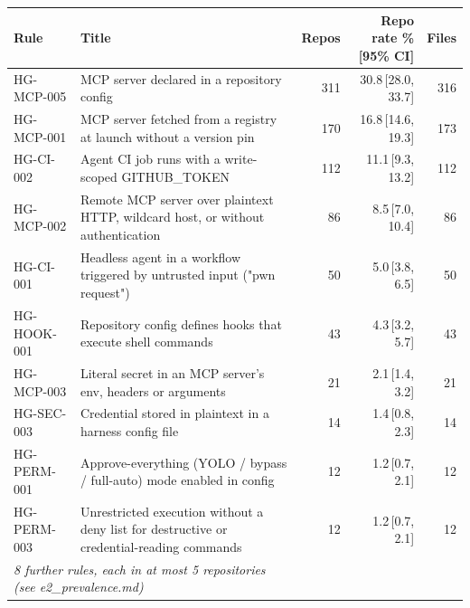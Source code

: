 \begin{tabular}{llrrr}
\toprule
Rule & Title & Repos & Repo rate \% [95\% CI] & Files \\
\midrule
HG-MCP-005 & MCP server declared in a repository config & 311 & 30.8\,[28.0, 33.7] & 316 \\
HG-MCP-001 & MCP server fetched from a registry at launch without a version pin & 170 & 16.8\,[14.6, 19.3] & 173 \\
HG-CI-002 & Agent CI job runs with a write-scoped GITHUB\_TOKEN & 112 & 11.1\,[9.3, 13.2] & 112 \\
HG-MCP-002 & Remote MCP server over plaintext HTTP, wildcard host, or without authentication & 86 & 8.5\,[7.0, 10.4] & 86 \\
HG-CI-001 & Headless agent in a workflow triggered by untrusted input ("pwn request") & 50 & 5.0\,[3.8, 6.5] & 50 \\
HG-HOOK-001 & Repository config defines hooks that execute shell commands & 43 & 4.3\,[3.2, 5.7] & 43 \\
HG-MCP-003 & Literal secret in an MCP server's env, headers or arguments & 21 & 2.1\,[1.4, 3.2] & 21 \\
HG-SEC-003 & Credential stored in plaintext in a harness config file & 14 & 1.4\,[0.8, 2.3] & 14 \\
HG-PERM-001 & Approve-everything (YOLO / bypass / full-auto) mode enabled in config & 12 & 1.2\,[0.7, 2.1] & 12 \\
HG-PERM-003 & Unrestricted execution without a deny list for destructive or credential-reading commands & 12 & 1.2\,[0.7, 2.1] & 12 \\
\multicolumn{2}{l}{\emph{8 further rules, each in at most 5 repositories (see e2\_prevalence.md)}} & & & \\
\bottomrule
\end{tabular}
